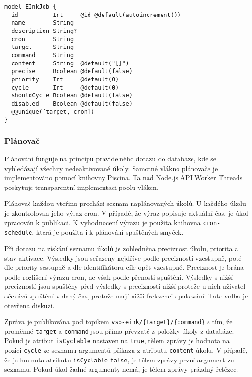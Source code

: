 \begin{lstlisting}[label=src:scheduler-schema,caption={Datové schéma třídy EInkJob}]
model EInkJob {
  id          Int     @id @default(autoincrement())
  name        String
  description String?
  cron        String
  target      String
  command     String
  content     String  @default("[]")
  precise     Boolean @default(false)
  priority    Int     @default(0)
  cycle       Int     @default(0)
  shouldCycle Boolean @default(false)
  disabled    Boolean @default(false)
  @@unique([target, cron])
}
\end{lstlisting}

\subsubsection{Plánovač}
Plánování funguje na principu pravidelného dotazu do databáze, kde se vyhledávají všechny nedeaktivované úkoly. Samotné vlákno plánovače je implementováno pomocí knihovny Piscina. Ta nad Node.js API Worker Threads poskytuje transparentní implementaci poolu vláken.

Plánovač každou vteřinu prochází seznam naplánovaných úkolů. U každého úkolu je zkontrolován jeho výraz cron. V případě, že výraz popisuje aktuální čas, je úkol zpracován k publikaci. K vyhodnocení výrazu je použita knihovna \lstinline{cron-schedule}, která je použita i k plánování spuštěných smyček. 

Při dotazu na získání seznamu úkolů je zohledněna preciznost úkolu, priorita a stav aktivace. Výsledky jsou seřazeny nejdříve podle preciznosti vzestupně, poté dle priority sestupně a dle identifikátoru cíle opět vzestupně. Preciznost je brána podle rozlišení výrazu cron, ne však podle přenosti spuštění. Výsledky s nižší precizností jsou spuštěny před výsledky s precizností nižší protože u nich uživatel očekává spuštění v daný čas, protože mají nižší frekvenci opakování. Tato volba je otevřena diskuzi.

Zpráva je publikována pod topikem \lstinline|vsb-eink/{target}/{command}| s tím, že proměnné \lstinline{target} a \lstinline{command} jsou přímo převzaté z položky úkoly z databáze. Pokud je atribut \lstinline{isCyclable} nastaven na \lstinline{true}, tělem zprávy je hodnota na pozici \lstinline{cycle} ze seznamu argumentů příkazu z atributu \lstinline{content} úkolu. V případě, že je hodnota atributu \lstinline{isCyclable} \lstinline{false}, je tělem zprávy první argument ze seznamu. Pokud úkol žadné argumenty nemá, je tělem zprávy prázdný řetězec.

